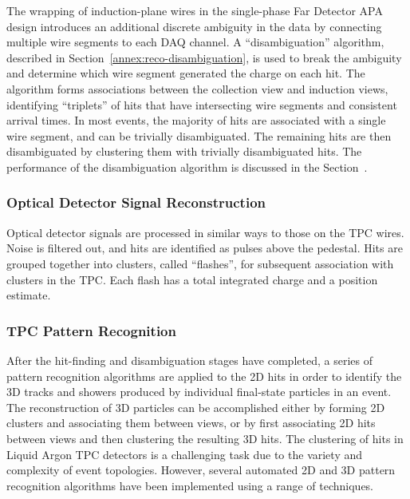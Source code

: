 The wrapping of induction-plane wires in the single-phase Far Detector APA design
introduces an additional discrete ambiguity in the data by connecting multiple wire
segments to each DAQ channel. A ``disambiguation'' algorithm,
described in Section~\ref{annex:reco-disambiguation}, is used to break the
ambiguity and determine which wire segment generated the charge on each hit.
The algorithm forms associations between the collection view and induction views,
identifying ``triplets'' of hits that have intersecting wire segments
and consistent arrival times. In most events, the majority of hits are
associated with a single wire segment, and can be trivially disambiguated.
The remaining hits are then disambiguated by clustering them with trivially disambiguated hits.
The performance of the disambiguation algorithm is discussed in the Section~\cite{annex:disambiguation}.

\subsubsection{Optical Detector Signal Reconstruction}

Optical detector signals are processed in similar ways to those on the TPC wires.
Noise is filtered out, and hits are identified as pulses above the pedestal.
Hits are grouped together into clusters, called ``flashes'', for subsequent
association with clusters in the TPC.  Each flash has a total integrated charge and a position
estimate.


\subsubsection{TPC Pattern Recognition}

After the hit-finding and disambiguation stages have completed, a series of 
pattern recognition algorithms are applied to the 2D hits in order to identify 
the 3D tracks and showers produced by individual final-state particles in an event.
The reconstruction of 3D particles can be accomplished either by forming 2D clusters
and associating them between views, or by first associating 2D hits between views
and then clustering the resulting 3D hits. 
The clustering of hits in Liquid Argon TPC detectors is a challenging task
due to the variety and complexity of event topologies.
However, several automated 2D and 3D pattern recognition algorithms have been 
implemented using a range of techniques.

